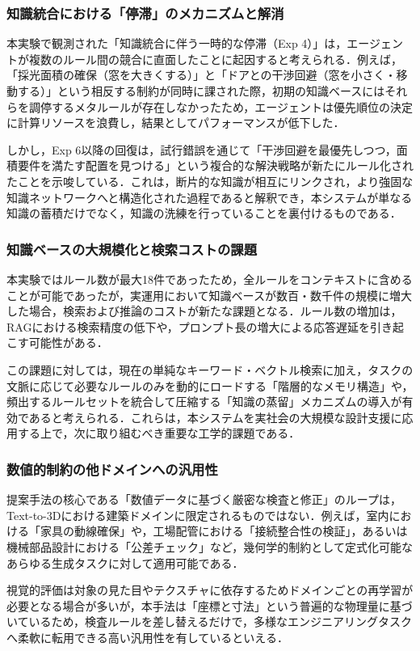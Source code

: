 \documentclass[dvipdfmx, a4paper, 9pt]{deimj}
\begin{document}
\subsubsection{知識統合における「停滞」のメカニズムと解消}
本実験で観測された「知識統合に伴う一時的な停滞（Exp 4）」は，エージェントが複数のルール間の競合に直面したことに起因すると考えられる．例えば，「採光面積の確保（窓を大きくする）」と「ドアとの干渉回避（窓を小さく・移動する）」という相反する制約が同時に課された際，初期の知識ベースにはそれらを調停するメタルールが存在しなかったため，エージェントは優先順位の決定に計算リソースを浪費し，結果としてパフォーマンスが低下した．

しかし，Exp 6以降の回復は，試行錯誤を通じて「干渉回避を最優先しつつ，面積要件を満たす配置を見つける」という複合的な解決戦略が新たにルール化されたことを示唆している．これは，断片的な知識が相互にリンクされ，より強固な知識ネットワークへと構造化された過程であると解釈でき，本システムが単なる知識の蓄積だけでなく，知識の洗練を行っていることを裏付けるものである．

\subsubsection{知識ベースの大規模化と検索コストの課題}
本実験ではルール数が最大18件であったため，全ルールをコンテキストに含めることが可能であったが，実運用において知識ベースが数百・数千件の規模に増大した場合，検索および推論のコストが新たな課題となる．ルール数の増加は，RAGにおける検索精度の低下や，プロンプト長の増大による応答遅延を引き起こす可能性がある．

この課題に対しては，現在の単純なキーワード・ベクトル検索に加え，タスクの文脈に応じて必要なルールのみを動的にロードする「階層的なメモリ構造」や，頻出するルールセットを統合して圧縮する「知識の蒸留」メカニズムの導入が有効であると考えられる．これらは，本システムを実社会の大規模な設計支援に応用する上で，次に取り組むべき重要な工学的課題である．

\subsubsection{数値的制約の他ドメインへの汎用性}
提案手法の核心である「数値データに基づく厳密な検査と修正」のループは，Text-to-3Dにおける建築ドメインに限定されるものではない．例えば，室内における「家具の動線確保」や，工場配管における「接続整合性の検証」，あるいは機械部品設計における「公差チェック」など，幾何学的制約として定式化可能なあらゆる生成タスクに対して適用可能である．

視覚的評価は対象の見た目やテクスチャに依存するためドメインごとの再学習が必要となる場合が多いが，本手法は「座標と寸法」という普遍的な物理量に基づいているため，検査ルールを差し替えるだけで，多様なエンジニアリングタスクへ柔軟に転用できる高い汎用性を有しているといえる．
\end{document}
